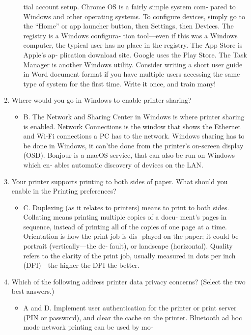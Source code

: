 \documentclass{article}
\begin{document}
\begin{enumerate}
\begin{itemize}
tial account setup. Chrome OS is a fairly simple system com‐
pared to Windows and other operating systems. To configure
devices, simply go to the “Home” or app launcher button, then
Settings, then Devices. The registry is a Windows configura‐
tion tool—even if this was a Windows computer, the typical
user has no place in the registry. The App Store is Apple’s ap‐
plication download site. Google uses the Play Store. The Task
Manager is another Windows utility. Consider writing a short
user guide in Word document format if you have multiple
users accessing the same type of system for the first time.
Write it once, and train many!
    \end{itemize}
   \item Where would you go in Windows to enable printer sharing?
    \begin{itemize}
        \item B. The Network and Sharing Center in Windows is where
printer sharing is enabled. Network Connections is the window
that shows the Ethernet and Wi-Fi connections a PC has to the
network. Windows sharing has to be done in Windows, it can’tbe done from the printer’s on-screen display (OSD). Bonjour is
a macOS service, that can also be run on Windows which en‐
ables automatic discovery of devices on the LAN.
    \end{itemize}
    \item Your printer supports printing to both sides of paper. What
should you enable in the Printing preferences?
    \begin{itemize}
        \item C. Duplexing (as it relates to printers) means to print to both
sides. Collating means printing multiple copies of a docu‐
ment’s pages in sequence, instead of printing all of the copies
of one page at a time. Orientation is how the print job is dis‐
played on the paper; it could be portrait (vertically—the de‐
fault), or landscape (horizontal). Quality refers to the clarity of
the print job, usually measured in dots per inch (DPI)—the
higher the DPI the better.
    \end{itemize}
    \item Which of the following address printer data privacy concerns?
(Select the two best answers.)
    \begin{itemize}
        \item A and D. Implement user authentication for the printer or print
server (PIN or password), and clear the cache on the printer.
Bluetooth ad hoc mode network printing can be used by mo‐

\end{itemize}
\end{enumerate}
\end{document}
